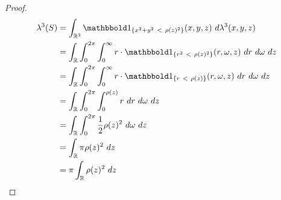 \begin{proof}
	\begin{align*}
		\lambda^3(S) 
		&= \int_{\bR^3} \boldone_{\lr{x^2 + y^2~ <~ \rho(z)^2}}(x,y,z) ~d\lambda^3(x,y,z)\\
		&= \int_{\bR} \int_{0}^{2\pi} \int_0^\infty r \cdot \boldone_{\lr{r^2~ <~ \rho(z)^2}}(r,\omega,z) ~dr ~d\omega ~dz\\
		&= \int_{\bR} \int_{0}^{2\pi} \int_0^\infty r \cdot \boldone_{\lr{r~ <~ \rho(z)}}(r,\omega,z) ~dr ~d\omega ~dz\\
		&= \int_{\bR} \int_{0}^{2\pi} \int_0^{\rho(z)} r ~dr ~d\omega ~dz\\
		&= \int_{\bR} \int_{0}^{2\pi} \frac{1}{2} \rho(z)^2 ~d\omega ~dz\\
		&= \int_{\bR} \pi \rho(z)^2 ~dz\\
		&= \pi \int_{\bR} \rho(z)^2 ~dz
	\end{align*}
\end{proof}
\clearpage
